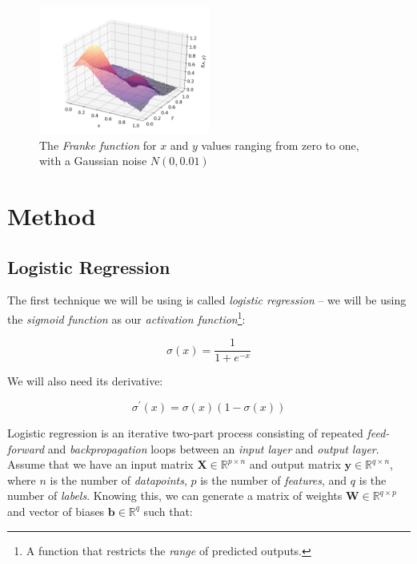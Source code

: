 \documentclass[a4paper,10pt,english]{article}
\begin{document}
\begin{multicols*}{2}
\begin{figure}[H]
	\centering
	\includegraphics[width = 0.5\textwidth, center]{Franke_noise.png}
	\caption{The \textit{Franke function} for $x$ and $y$ values ranging from zero to one, with a Gaussian noise $N(0,0.01)$\label{fig_Franke_noise}}
\end{figure}

\section*{Method}

\subsection*{Logistic Regression}

The first technique we will be using is called \textit{logistic regression} – we will be using the \textit{sigmoid function} as our \textit{activation function}\footnote{A function that restricts the \textit{range} of predicted outputs.}:

\begin{equation}
\label{eq_sigmoid}
\sigma(x) = \frac{1}{1 + e^{-x}}
\end{equation}

We will also need its derivative:

\begin{equation}
\label{eq_diff_sigmoid}
\sigma^\prime(x) = \sigma(x) (1 - \sigma(x))
\end{equation}

Logistic regression is an iterative two-part process consisting of repeated \textit{feed-forward} and \textit{backpropagation} loops between an \textit{input layer} and \textit{output layer}.  Assume that we have an input matrix $\mathbf{X} \in \mathbb{R}^{p \times n}$ and output matrix $\mathbf{y} \in \mathbb{R}^{q \times n}$, where $n$ is the number of \textit{datapoints}, $p$ is the number of \textit{features}, and $q$ is the number of \textit{labels}.  Knowing this, we can generate a matrix of weights $\mathbf{W} \in \mathbb{R}^{q \times p}$ and vector of biases $\mathbf{b} \in \mathbb{R}^q$ such that:


\end{multicols*}
\end{document}
